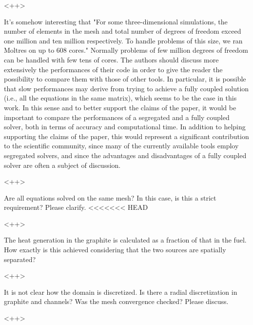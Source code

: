 \documentclass[answers,11pt]{exam}
\begin{document}
\begin{questions}
\begin{solution}
<++>
\end{solution}



\question  It's somehow interesting that "For some three-dimensional simulations, the number of elements in the mesh and total number of degrees of freedom exceed one million and ten million respectively. To handle problems of this size, we ran Moltres on up to 608 cores." Normally problems of few million degrees of freedom can be handled with few tens of cores. The authors should discuss more extensively the performances of their code in order to give the reader the possibility to compare them with those of other tools. In particular, it is possible that slow performances may derive from trying to achieve a fully coupled solution (i.e., all the equations in the same matrix), which seems to be the case in this work. In this sense and to better support the claims of the paper, it would be important to compare the performances of a segregated and a fully coupled  solver, both in terms of accuracy and computational time. In addition to helping supporting the claims of the paper, this
would represent a significant contribution to the scientific community, since many of the currently available tools employ segregated solvers, and since the advantages and disadvantages of a fully coupled solver are often a subject of discussion.


\begin{solution}
<++>
\end{solution}


\question Are all equations solved on the same mesh? In this case, is this a strict requirement? Please clarify.
<<<<<<< HEAD

\begin{solution}
<++>
\end{solution}


\question The heat generation in the graphite is calculated as a fraction of that in the fuel. How exactly is this achieved considering that the two sources are spatially separated?

\begin{solution}
<++>
\end{solution}


\question It is not clear how the domain is discretized. Is there a radial discretization in graphite and channels? Was the mesh convergence checked? Please discuss.

\begin{solution}
<++>
\end{solution}



\end{questions}
\end{document}
